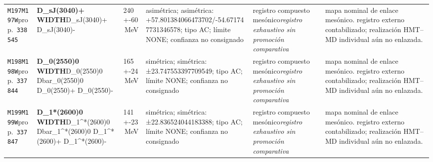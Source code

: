 \begin{landscape}
\begin{longtable}{L{1.85cm}L{4.45cm}L{2.35cm}L{4.05cm}L{3.35cm}L{7.15cm}}
\texttt{M197}\newline \texttt{M197W}\newline prop.\ \texttt{338545} & \textbf{D\_\allowbreak{}sJ(3040)+ WIDTH}\newline D\_\allowbreak{}sJ(3040)+ \textbar{}\allowbreak{} D\_\allowbreak{}sJ(3040)- & 240+-60\,MeV & asimétrica; asimétrica: +57.801384066473702/-54.671747731346578; tipo AC; límite NONE; confianza no consignado & registro compuesto mesónico\newline \emph{registro exhaustivo sin promoción comparativa} & mapa nominal de enlace mesónico. registro externo contabilizado; realización HMT--MD individual aún no enlazada. \\
\texttt{M198}\newline \texttt{M198W}\newline prop.\ \texttt{337844} & \textbf{D\_\allowbreak{}0(2550)0 WIDTH}\newline D\_\allowbreak{}0(2550)0 \textbar{}\allowbreak{} Dbar\_\allowbreak{}0(2550)0 \textbar{}\allowbreak{} D\_\allowbreak{}0(2550)+ \textbar{}\allowbreak{} D\_\allowbreak{}0(2550)- & 165+-24\,MeV & simétrica; simétrica: ±23.747553397709549; tipo AC; límite NONE; confianza no consignado & registro compuesto mesónico\newline \emph{registro exhaustivo sin promoción comparativa} & mapa nominal de enlace mesónico. registro externo contabilizado; realización HMT--MD individual aún no enlazada. \\
\texttt{M199}\newline \texttt{M199W}\newline prop.\ \texttt{337847} & \textbf{D\_\allowbreak{}1*(2600)0 WIDTH}\newline D\_\allowbreak{}1\textasciicircum{}*(2600)0 \textbar{}\allowbreak{} Dbar\_\allowbreak{}1\textasciicircum{}*(2600)0 \textbar{}\allowbreak{} D\_\allowbreak{}1\textasciicircum{}*(2600)+ \textbar{}\allowbreak{} D\_\allowbreak{}1\textasciicircum{}*(2600)- & 141+-23\,MeV & simétrica; simétrica: ±22.836524044183388; tipo AC; límite NONE; confianza no consignado & registro compuesto mesónico\newline \emph{registro exhaustivo sin promoción comparativa} & mapa nominal de enlace mesónico. registro externo contabilizado; realización HMT--MD individual aún no enlazada. \\

\end{longtable}
\end{landscape}
